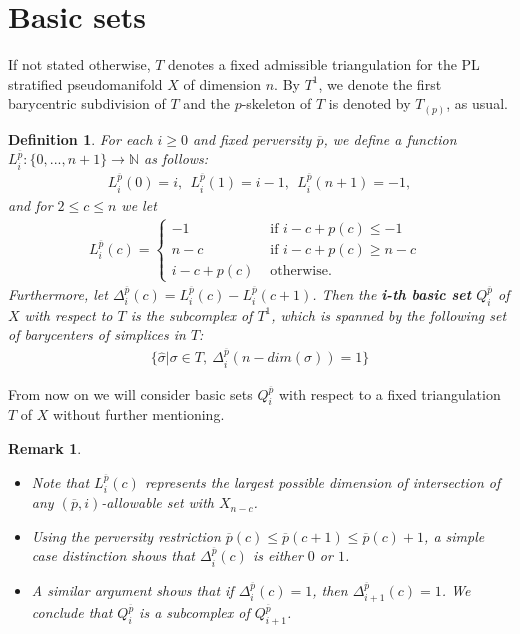 \documentclass{scrreprt}
\newtheorem{definition}[prop]{Definition}
\newtheorem{remark}[prop]{Remark}
\begin{document}
\section{Basic sets}

If not stated otherwise, $T$ denotes a fixed admissible triangulation for the PL stratified pseudomanifold $X$ of dimension $n$. By $T^1$, we denote the first barycentric subdivision of $T$ and the $p$-skeleton of $T$ is denoted by $T_{(p)}$, as usual.

\begin{definition}
For each $i \geq 0$ and fixed perversity $\overline{p}$, we define a function \\ $L_i^{\overline{p}}: \{ 0,...,n+1 \} \to \mathbb{N}$ as follows: 
\begin{align*}
L_i^{\overline{p}}(0)=i,\ \ L_i^{\overline{p}}(1)=i-1,\ \ L_i^{\overline{p}}(n+1)=-1,
\end{align*}
and for $2 \leq c \leq n$ we let
\begin{align*}
L_i^{\overline{p}}(c)=
\begin{cases}
-1 &\text{ if $i-c+p(c) \leq -1$}  \\
n-c &\text{ if $i-c+p(c) \geq n-c$ } \\
i-c+p(c) &\text{ otherwise.}
\end{cases}
\end{align*}
Furthermore, let $\Delta_i^{\overline{p}}(c)=L_i^{\overline{p}}(c) - L_i^{\overline{p}}(c+1)$. Then the \textbf{i-th basic set} $Q_i^{\overline{p}}$ of $X$ with respect to $T$ is the subcomplex of $T^1$, which is spanned by the following set of barycenters of simplices in $T$:
\begin{align*}
\{ \hat{\sigma} | \sigma \in T,\ \Delta_i^{\overline{p}}(n-dim(\sigma))=1\}
\end{align*}
\end{definition}

From now on we will consider basic sets $Q_i^{\overline{p}}$ with respect to a fixed triangulation $T$ of $X$ without further mentioning.

\begin{remark}\label{remarkbasic}
\begin{itemize}
\item[1.] Note that $L_i^{\overline{p}}(c)$ represents the largest possible dimension of intersection of any $(\overline{p},i)$-allowable set with $X_{n-c}$.
\item[2.] Using the perversity restriction $\overline{p}(c) \leq \overline{p}(c+1) \leq \overline{p}(c)+1$, a simple case distinction shows that $\Delta_i^{\overline{p}}(c)$ is either $0$ or $1$.
\item[3.] A similar argument shows that if $\Delta_i^{\overline{p}}(c)=1$, then $\Delta_{i+1}^{\overline{p}}(c)=1$. We conclude that $Q_i^{\overline{p}}$ is a subcomplex of $Q_{i+1}^{\overline{p}}$.
\end{itemize}
\end{remark}
\end{document}
